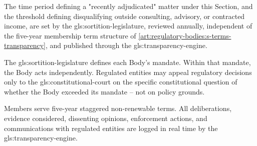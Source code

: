 The time period defining a "recently adjudicated" matter under this Section, and the threshold defining disqualifying outside consulting, advisory, or contracted income, are set by the \gls{gls:sortition-legislature}, reviewed annually, independent of the five-year membership term structure of \ref{art:regulatory-bodies:s-terms-transparency}, and published through the \gls{gls:transparency-engine}.

The \gls{gls:sortition-legislature} defines each Body's mandate. Within that mandate, the Body acts independently. Regulated entities may appeal regulatory decisions only to the \gls{gls:constitutional-court} on the specific constitutional question of whether the Body exceeded its mandate -- not on policy grounds.

Members serve five-year staggered non-renewable terms. All deliberations, evidence considered, dissenting opinions, enforcement actions, and communications with regulated entities are logged in real time by the \gls{gls:transparency-engine}.

